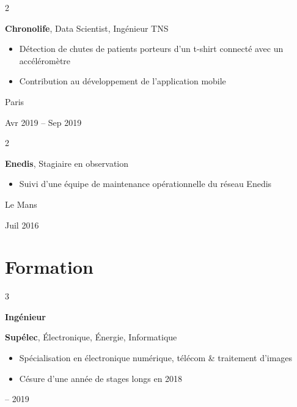 \documentclass[10pt, letterpaper]{article}
\newenvironment{highlights}{
    \begin{itemize}[
        topsep=0.10 cm,
        parsep=0.10 cm,
        partopsep=0pt,
        itemsep=0pt,
        leftmargin=0.4 cm + 10pt
    ]
}{
    \end{itemize}
} %
\newenvironment{twocolentry}[2][]{
    \onecolentry
    \def\secondColumn{#2}
    \setcolumnwidth{\fill, 3.5 cm}
    \begin{paracol}{2}
}{
    \switchcolumn \raggedleft \secondColumn
    \end{paracol}
    \endonecolentry
} %
\newenvironment{threecolentry}[3][]{
    \onecolentry
    \def\thirdColumn{#3}
    \setcolumnwidth{2.5 cm, \fill, 3.5 cm}
    \begin{paracol}{3}
    {\raggedright #2} \switchcolumn
}{
    \switchcolumn \raggedleft \thirdColumn
    \end{paracol}
    \endonecolentry
} %
\begin{document}
        \vspace{0.2 cm}

        \begin{twocolentry}{
            Paris

        Avr 2019 – Sep 2019
        }
            \textbf{Chronolife}, Data Scientist, Ingénieur TNS
            \begin{highlights}
                \item Détection de chutes de patients porteurs d'un t-shirt connecté avec un accéléromètre
                \item Contribution au développement de l'application mobile
            \end{highlights}
        \end{twocolentry}


        \vspace{0.2 cm}

        \begin{twocolentry}{
            Le Mans

        Juil 2016
        }
            \textbf{Enedis}, Stagiaire en observation
            \begin{highlights}
                \item Suivi d'une équipe de maintenance opérationnelle du réseau Enedis
            \end{highlights}
        \end{twocolentry}



    
    \section{Formation}



        
        \begin{threecolentry}{\textbf{Ingénieur}}{
            2015 – 2019
        }
            \textbf{Supélec}, Électronique, Énergie, Informatique
            \begin{highlights}
                \item Spécialisation en électronique numérique, télécom \& traitement d'images
                \item Césure d'une année de stages longs en 2018
            \end{highlights}
        \end{threecolentry}

        \vspace{0.2 cm}
\end{document}
